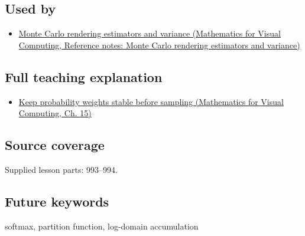 \subsection{Used by}\label{appendix-d580b422240f-used-by}

\begin{itemize}
\tightlist
\item
  \href{../02-Mathematics-for-Visual-Computing/main.pdf\#nameddest=appendix-031e02bf28af}{Monte Carlo rendering estimators and variance (Mathematics for Visual Computing, Reference notes: Monte Carlo rendering estimators and variance)}
\end{itemize}

\subsection{Full teaching explanation}\label{appendix-d580b422240f-full-teaching-explanation}

\begin{itemize}
\tightlist
\item
  \href{../02-Mathematics-for-Visual-Computing/main.pdf\#nameddest=02-foundations-ii-ch031-keep-probability-weights-stable-before-sampling}{Keep probability weights stable before sampling (Mathematics for Visual Computing, Ch. 15)}
\end{itemize}

\subsection{Source coverage}\label{appendix-d580b422240f-source-coverage}

Supplied lesson parts: 993--994.

\subsection{Future keywords}\label{appendix-d580b422240f-future-keywords}

softmax, partition function, log-domain accumulation
